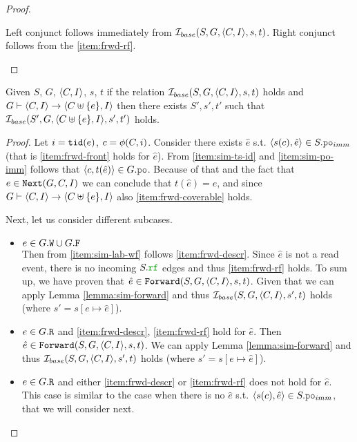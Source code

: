 \documentclass[12pt]{article}
\begin{document}
\begin{proof}
\begin{itemize}
    Left conjunct follows immediately from $\mathcal{I}_{base}(S, G, \langle C, I \rangle, s, t)$.
    Right conjunct follows from the \ref{item:frwd-rf}.
    
  \end{itemize}
  
\end{proof}

\begin{lemma}
  Given $S$, $G$, $\langle C, I \rangle$, $s$, $t$
  if the relation $\mathcal{I}_{base}(S, G, \langle C, I \rangle, s, t)$ holds and
  $G \vdash \langle C, I \rangle \rightarrow \langle C \uplus \{e\}, I \rangle$ then
  there exists $S', s', t'$ such that $\mathcal{I}_{base}(S', G, \langle C \uplus \{e\}, I \rangle, s', t')$ holds.
\end{lemma}

\begin{proof}
  Let $i = {\mathtt{tid}}(e)$, $c = \phi(C, i)$.
  Consider there exists $\hat{e}$ s.t. $\tup{s(c), \hat{e}} \in S.\lPO_{imm}$
  (that is \ref{item:frwd-front} holds for $\hat{e}$).
  From \ref{item:sim-ts-id} and \ref{item:sim-po-imm}
  follows that $\tup{c, t(\hat{e})} \in G.\lPO$.
  Because of that and the fact that $e \in {\mathtt{Next}}(G, C, I)$
  we can conclude that $t(\hat{e}) = e$,
  and since $G \vdash \langle C, I \rangle \rightarrow \langle C \uplus \{e\}, I \rangle$
  also \ref{item:frwd-coverable} holds.
  
  Next, let us consider different subcases.  

  \begin{itemize}
    \item $e \in G.{\mathtt{W}} \cup G.{\mathtt{F}}$ \\
      Then from \ref{item:sim-lab-wf} follows \ref{item:frwd-descr}.
      Since $\hat{e}$ is not a read event, there is no incoming $S.\lRF$ edges
      and thus \ref{item:frwd-rf} holds.
      To sum up, we have proven that $\hat{e} \in {\mathtt{Forward}}(S, G, \langle C, I \rangle, s, t)$.
      Given that we can apply Lemma \ref{lemma:sim-forward}
      and thus $\mathcal{I}_{base}(S, G, \langle C, I \rangle, s', t)$ holds
      (where $s' = s[e \mapsto \hat{e}]$).

    \item $e \in G.{\mathtt{R}}$ and \ref{item:frwd-descr}, \ref{item:frwd-rf} hold for $\hat{e}$.
      Then $\hat{e} \in {\mathtt{Forward}}(S, G, \langle C, I \rangle, s, t)$.
      We can apply Lemma \ref{lemma:sim-forward}
      and thus $\mathcal{I}_{base}(S, G, \langle C, I \rangle, s', t)$ holds
      (where $s' = s[e \mapsto \hat{e}]$).

    \item $e \in G.{\mathtt{R}}$ and either \ref{item:frwd-descr} or \ref{item:frwd-rf}
      does not hold for $\hat{e}$.
      This case is similar to the case when there is no
      $\hat{e}$ s.t. $\tup{s(c), \hat{e}} \in S.\lPO_{imm}$,
      that we will consider next.
  \end{itemize}
  

\end{proof}
\end{document}

